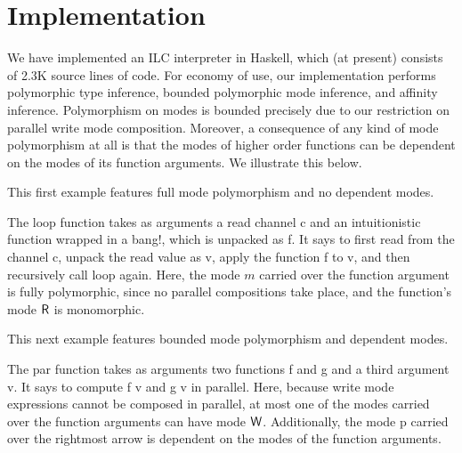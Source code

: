 \section{Implementation}
\label{sec:implementation}

We have implemented an ILC interpreter in Haskell, which (at present) consists
of 2.3K source lines of code.  For economy of use, our implementation performs
polymorphic type inference, bounded polymorphic mode inference, and affinity
inference. Polymorphism on modes is bounded precisely due to our restriction on
parallel write mode composition. Moreover, a consequence of any kind of mode
polymorphism at all is that the modes of higher order functions can be dependent
on the modes of its function arguments. We illustrate this below.

This first example features full mode polymorphism and no dependent modes.

The \textsf{loop} function
takes as arguments a read channel \textsf{c} and an intuitionistic function
wrapped in a bang!, which is unpacked as \textsf{f}.  It says to first read from
the channel \textsf{c}, unpack the read value as \textsf{v}, apply the function
\textsf{f} to \textsf{v}, and then recursively call \textsf{loop} again. Here,
the mode $m$ carried over the function argument is fully polymorphic, since no
parallel compositions take place, and the function's mode $\textsf{R}$ is monomorphic.

This next example features bounded mode polymorphism and dependent modes.

The \textsf{par} function takes as arguments two functions \textsf{f} and
\textsf{g} and a third argument \textsf{v}. It says to compute \textsf{f v} and
\textsf{g v} in parallel. Here, because write mode expressions cannot be
composed in parallel, at most one of the modes carried over the function
arguments can have mode $\textsf{W}$. Additionally, the mode \textsf{p} carried over
the rightmost arrow is dependent on the modes of the function arguments.
